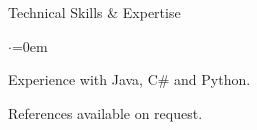 \documentclass{resume}
\begin{document}
	\begin{rSection}{Technical Skills \& Expertise }
  	\begin{list}{$\cdot$}{\leftmargin=0em}
  		\item Experience with Java, C# and Python.	
  	\end{list}


    
	{ References available on request. }
    
	\end{rSection}
\end{document}
